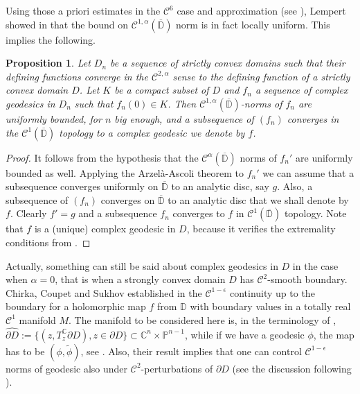 \documentclass[a4paper,12pt]{amsart}
\newtheorem{proposition}[theorem]{Proposition}
\theoremstyle{remark}\newtheorem{remark}[theorem]{Remark}
\begin{document}
Using those a priori estimates in the $\mathcal C^6$ case and approximation (see \cite[p. 562--563]{L3}), Lempert showed in \cite[Proposition 3]{L4} that the bound on $\mathcal C^{1,\alpha}(\overline{\mathbb D})$ norm is in fact locally uniform. 
This implies the following. 

\begin{proposition}
\label{prop:c1conv}
Let $D_n$ be a sequence of strictly convex domains such that their defining functions converge 
in the $\mathcal C^{2,\alpha}$ sense to the defining function of 
a strictly convex domain $D$. Let $K$ be a compact subset of $D$ and $f_n$  a sequence of complex geodesics in $D_n$ such that $f_n(0)\in K$. Then $\mathcal C^{1,\alpha}(\overline{\mathbb D})$-norms of $f_n$ are uniformly bounded, for $n$ big enough, and a subsequence of $(f_n)$ converges in the $\mathcal C^1(\overline{\mathbb D})$ topology
to a complex geodesic we denote by $f$.
\end{proposition}
\begin{proof}
 It follows from the hypothesis that the $\mathcal C^{\alpha}(\overline{\mathbb D})$ norms of $f_n'$ are uniformly bounded as well. Applying the Arzel\`a-Ascoli theorem to $f_n'$ we can assume that a subsequence converges uniformly on $\overline{\mathbb D}$ to an analytic disc, say $g$. Also, a subsequence of $(f_n)$ converges on $\overline{\mathbb D}$ to an analytic disc that we shall denote by $f$. Clearly $f'=g$ and a subsequence $f_n$ converges to $f$ in $\mathcal C^1(\overline{\mathbb D})$ topology. Note that $f$ is a (unique) complex geodesic in $D$, because
 it verifies the extremality conditions from \cite{L1}.
 \end{proof}


Actually,  something can still be said about complex geodesics in $D$ in the case when $\alpha=0$, that is when a strongly convex domain $D$ has $\mathcal C^2$-smooth boundary. Chirka, Coupet and Sukhov established in \cite[Corollary 1.5]{CCS} the $\mathcal C^{1-\epsilon}$ continuity up to the boundary for a holomorphic map $f$ from $\mathbb D$
with boundary values in a totally real $\mathcal C^1$ manifold $M$.  The manifold to be considered here
is, in the terminology of \cite{L3}, $\widehat{\partial D}:= \{(z, T_z^{\mathbb C} \partial D), z\in \partial D\} \subset\mathbb C^n\times \mathbb P^{n-1}$, while if we have a geodesic $\phi$, the map has to be $(\phi,\tilde \phi)$, see
\cite[proof of Lemma 3.1]{L3}.
Also, their result implies that one can control $\mathcal C^{1-\epsilon}$ norms of geodesic also under $\mathcal C^2$-perturbations of $\partial D$ (see the discussion following \cite[Corollary 1.5]{CCS}).
\end{document}

